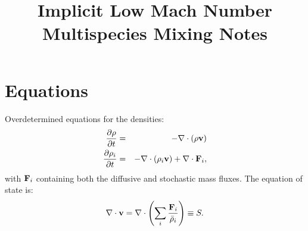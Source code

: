 \documentclass[final]{siamltex}
\def\Fb {{\bf F}}
\def\vb {{\bf v}}
\begin{document}
\title{Implicit Low Mach Number Multispecies Mixing Notes}

\maketitle

\section{Equations}
Overdetermined equations for the densities:
\begin{eqnarray}
\frac{\partial\rho}{\partial t} &=& -\nabla\cdot(\rho\vb)\\
\frac{\partial\rho_i}{\partial t} &=& -\nabla\cdot(\rho_i\vb) + \nabla\cdot\Fb_i,
\end{eqnarray}
with $\Fb_i$ containing both the diffusive and stochastic mass fluxes.  The equation of state is:
\begin{equation}
\nabla\cdot\vb = \nabla\cdot\left(\sum_i\frac{\Fb_i}{\bar\rho_i}\right) \equiv S\label{eq:S}.
\end{equation}

\clearpage
\end{document}

